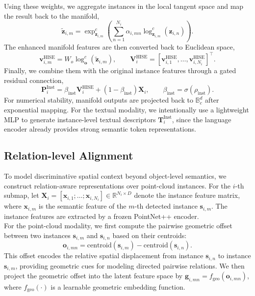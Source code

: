 \documentclass{article}
\begin{document}
Using these weights, we aggregate instances in the local tangent space and map the result back to the manifold,
\begin{equation}
\tilde{\mathbf{z}}_{i,m}
=
\exp_{\mathbf{z}_{i,m}}^{c}\!\left(
\sum_{n=1}^{N_i}
\alpha_{i,mn}
\log_{\mathbf{z}_{i,m}}^{c}(\mathbf{z}_{i,n})
\right).
\end{equation}
The enhanced manifold features are then converted back to Euclidean space,
\begin{equation}
\mathbf{v}^{\mathrm{HISE}}_{i,m}
=
W_o\log_{\mathbf{o}}^{c}(\tilde{\mathbf{z}}_{i,m}),
\qquad
\mathbf{V}^{\mathrm{HISE}}_i
=
[\mathbf{v}^{\mathrm{HISE}}_{i,1},\ldots,\mathbf{v}^{\mathrm{HISE}}_{i,N_i}]^\top .
\end{equation}
Finally, we combine them with the original instance features through a gated residual connection,
\begin{equation}
\mathbf{P}^{\mathrm{Inst}}_i
=
\beta_{\mathrm{inst}}\mathbf{V}^{\mathrm{HISE}}_i
+
(1-\beta_{\mathrm{inst}})\mathbf{X}_i,
\qquad
\beta_{\mathrm{inst}}=\sigma(\rho_{\mathrm{inst}}).
\end{equation}
For numerical stability, manifold outputs are projected back to $\mathbb{B}_c^d$ after exponential mapping. For the textual modality, we intentionally use a lightweight MLP to generate instance-level textual descriptors $\mathbf{T}^{\mathrm{Inst}}_i$, since the language encoder already provides strong semantic token representations.
\subsection{Relation-level Alignment}
To model discriminative spatial context beyond object-level semantics, we construct relation-aware representations over point-cloud instances. For the $i$-th submap, let $\mathbf{X}_i=[\mathbf{x}_{i,1};\dots;\mathbf{x}_{i,N_i}]\in\mathbb{R}^{N_i \times D}$ denote the instance feature matrix, where $\mathbf{x}_{i,m}$ is the semantic feature of the $m$-th detected instance $\mathbf{s}_{i,m}$. The instance features are extracted by a frozen PointNet++ encoder.\\
\indent For the point-cloud modality, we first compute the pairwise geometric offset between two instances $\mathbf{s}_{i,m}$ and $\mathbf{s}_{i,n}$ based on their centroids:
\begin{equation}
\mathbf{o}_{i,mn}
=
\mathrm{centroid}(\mathbf{s}_{i,m})
-
\mathrm{centroid}(\mathbf{s}_{i,n}).
\end{equation}
This offset encodes the relative spatial displacement from instance $\mathbf{s}_{i,n}$ to instance $\mathbf{s}_{i,m}$, providing geometric cues for modeling directed pairwise relations. We then project the geometric offset into the latent feature space by $\mathbf{g}_{i,mn}=f_{\mathrm{geo}}(\mathbf{o}_{i,mn})$, where $f_{\mathrm{geo}}(\cdot)$ is a learnable geometric embedding function.
\end{document}
